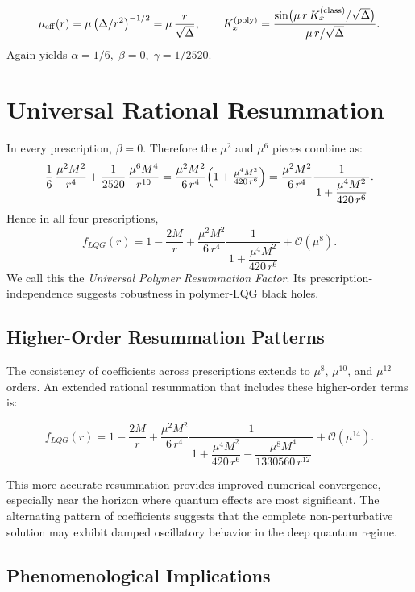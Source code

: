 \documentclass[11pt]{article}
\begin{document}
\[
\mu_{\rm eff}(r) = \mu\,\bigl(\Delta/r^2\bigr)^{-1/2} 
              = \mu\,\frac{r}{\sqrt{\Delta}}, 
\qquad
K_x^{(\text{poly})} = \frac{\sin\bigl(\mu\,r\,K_x^{(\text{class})}/\sqrt{\Delta}\bigr)}{\mu\,r/\sqrt{\Delta}}.
\]
Again yields \(\alpha=1/6,\;\beta=0,\;\gamma=1/2520.\)

\section{Universal Rational Resummation}

In every prescription, \(\beta=0\).  Therefore the \(\mu^2\) and \(\mu^6\) pieces combine as:
\[
\frac{1}{6}\,\frac{\mu^{2}M^{2}}{r^{4}}
+ \frac{1}{2520}\,\frac{\mu^{6}M^{4}}{r^{10}}
= \frac{\mu^{2}M^{2}}{6\,r^{4}}
  \Bigl(1 + \tfrac{\mu^{4}M^{2}}{420\,r^{6}}\Bigr)
= \frac{\mu^{2}M^{2}}{6\,r^{4}}
  \frac{1}{\,1 + \dfrac{\mu^{4}M^{2}}{420\,r^{6}}\,}.
\]
Hence in all four prescriptions,
\[
f_{LQG}(r)
= 1 - \frac{2M}{r}
+ \frac{\mu^{2}M^{2}}{6\,r^{4}}
  \frac{1}{\,1 + \dfrac{\mu^{4}M^{2}}{420\,r^{6}}\,}
+ \mathcal{O}(\mu^{8}).
\]
We call this the \emph{Universal Polymer Resummation Factor}.  Its prescription‐independence suggests robustness in polymer‐LQG black holes.

\subsection{Higher-Order Resummation Patterns}

The consistency of coefficients across prescriptions extends to $\mu^{8}$, $\mu^{10}$, and $\mu^{12}$ orders. An extended rational resummation that includes these higher-order terms is:

\begin{equation}
f_{LQG}(r)
= 1 - \frac{2M}{r}
+ \frac{\mu^{2}M^{2}}{6\,r^{4}}
  \frac{1}{\,1 + \dfrac{\mu^{4}M^{2}}{420\,r^{6}} - \dfrac{\mu^{8}M^{4}}{1330560\,r^{12}}\,}
+ \mathcal{O}(\mu^{14}).
\end{equation}

This more accurate resummation provides improved numerical convergence, especially near the horizon where quantum effects are most significant. The alternating pattern of coefficients suggests that the complete non-perturbative solution may exhibit damped oscillatory behavior in the deep quantum regime.

\subsection{Phenomenological Implications}
\end{document}
